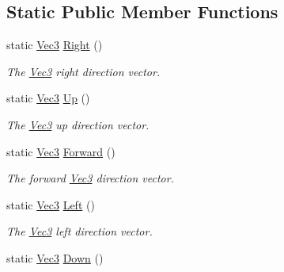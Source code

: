 \subsection*{Static Public Member Functions}
\begin{DoxyCompactItemize}
\item 
\hypertarget{classgfxmath_1_1_vec3_ac41642f6d63dd2b09812b827a093d5bb}{}static \hyperlink{classgfxmath_1_1_vec3}{Vec3} \hyperlink{classgfxmath_1_1_vec3_ac41642f6d63dd2b09812b827a093d5bb}{Right} ()\label{classgfxmath_1_1_vec3_ac41642f6d63dd2b09812b827a093d5bb}

\begin{DoxyCompactList}\small\item\em The \hyperlink{classgfxmath_1_1_vec3}{Vec3} right direction vector. \end{DoxyCompactList}\item 
\hypertarget{classgfxmath_1_1_vec3_a13e8fda938979d369a1f58aaf94c838a}{}static \hyperlink{classgfxmath_1_1_vec3}{Vec3} \hyperlink{classgfxmath_1_1_vec3_a13e8fda938979d369a1f58aaf94c838a}{Up} ()\label{classgfxmath_1_1_vec3_a13e8fda938979d369a1f58aaf94c838a}

\begin{DoxyCompactList}\small\item\em The \hyperlink{classgfxmath_1_1_vec3}{Vec3} up direction vector. \end{DoxyCompactList}\item 
\hypertarget{classgfxmath_1_1_vec3_a486a20b6e6e18a1bdd91ddb86a155fe2}{}static \hyperlink{classgfxmath_1_1_vec3}{Vec3} \hyperlink{classgfxmath_1_1_vec3_a486a20b6e6e18a1bdd91ddb86a155fe2}{Forward} ()\label{classgfxmath_1_1_vec3_a486a20b6e6e18a1bdd91ddb86a155fe2}

\begin{DoxyCompactList}\small\item\em The forward \hyperlink{classgfxmath_1_1_vec3}{Vec3} direction vector. \end{DoxyCompactList}\item 
\hypertarget{classgfxmath_1_1_vec3_a5ca084d183a88eb9c6e2acebe7c1e8e3}{}static \hyperlink{classgfxmath_1_1_vec3}{Vec3} \hyperlink{classgfxmath_1_1_vec3_a5ca084d183a88eb9c6e2acebe7c1e8e3}{Left} ()\label{classgfxmath_1_1_vec3_a5ca084d183a88eb9c6e2acebe7c1e8e3}

\begin{DoxyCompactList}\small\item\em The \hyperlink{classgfxmath_1_1_vec3}{Vec3} left direction vector. \end{DoxyCompactList}\item 
\hypertarget{classgfxmath_1_1_vec3_abc343c78307c7d9f46713b25b29ed62f}{}static \hyperlink{classgfxmath_1_1_vec3}{Vec3} \hyperlink{classgfxmath_1_1_vec3_abc343c78307c7d9f46713b25b29ed62f}{Down} ()\label{classgfxmath_1_1_vec3_abc343c78307c7d9f46713b25b29ed62f}


\end{DoxyCompactItemize}
